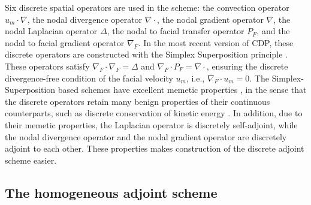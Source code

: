 Six discrete spatial operators are used in the scheme:
the convection operator $u_m \cdot \nabla$, the nodal divergence operator
$\nabla \cdot$, the nodal gradient operator $\nabla$, the nodal Laplacian
operator $\Delta$, the nodal to facial transfer operator $P_F$, and
the nodal to facial gradient operator $\nabla_F$.
In the most recent version of CDP, these discrete operators are constructed
with the Simplex Superposition principle \cite[]{ss}.  These operators satisfy
$\nabla_F \cdot \nabla_F = \Delta$ and $\nabla_F \cdot P_F = \nabla \cdot$,
ensuring the discrete divergence-free condition of the facial velocity $u_m$,
i.e., $\nabla_F \cdot u_m = 0$.  The Simplex-Superposition based schemes have
excellent memetic properties \cite[]{ss}, in the sense that the discrete
operators retain many benign properties of their continuous counterparts,
such as discrete conservation of kinetic energy \cite[]{kec}.
In addition, due to their memetic properties,
the Laplacian operator is discretely self-adjoint,
while the nodal divergence operator and the nodal gradient operator are
discretely adjoint to each other.
These properties makes construction of the discrete adjoint scheme easier.


\subsection{The homogeneous adjoint scheme}

